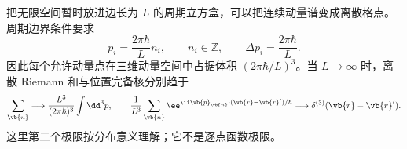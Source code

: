 
把无限空间暂时放进边长为 $L$ 的周期立方盒，可以把连续动量谱变成离散格点。周期边界条件要求
\begin{equation}
 {
 p_i=\frac{2\pi\hbar}{L}n_i,
 \qquad n_i\in\mathbb Z,
 \qquad
 \Delta p_i=\frac{2\pi\hbar}{L}.}
 \label{eq:periodic-box-momenta-dp68}
\end{equation}
因此每个允许动量点在三维动量空间中占据体积 $(2\pi\hbar/L)^3$。当 $L\to\infty$ 时，离散 Riemann 和与位置完备核分别趋于
\begin{equation}
{
\sum_{\vb{n}}\longrightarrow
\frac{L^3}{(2\pi\hbar)^3}\int\dd^3 p,
\qquad
\frac1{L^3}\sum_{\vb{n}}\ee^{\ii\vb{p}_{\vb{n}}\cdot(\vb{r}-\vb{r}')/\hbar}
\longrightarrow\delta^{(3)}(\vb{r}-\vb{r}').}
\label{eq:box-to-continuum-dp21}
\end{equation}
这里第二个极限按分布意义理解；它不是逐点函数极限。

